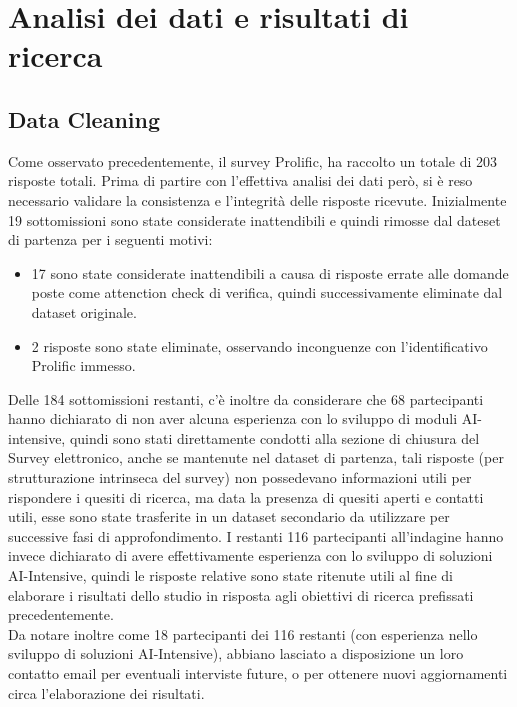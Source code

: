 \chapter{Analisi dei dati e  risultati di ricerca} %
%
     \section{Data Cleaning}
    
    Come osservato precedentemente, il survey Prolific, ha raccolto un totale di 203 risposte totali. Prima di partire con l'effettiva analisi dei dati però, si è reso necessario validare la consistenza e l'integrità delle risposte ricevute. Inizialmente 19 sottomissioni sono state considerate inattendibili e quindi rimosse dal dateset di partenza per i seguenti motivi:
    
    \begin{itemize}
        \item 17 sono state considerate inattendibili a causa di risposte errate alle domande poste come attenction check di verifica, quindi successivamente eliminate dal dataset originale.
        \item 2 risposte sono state eliminate, osservando inconguenze con l'identificativo Prolific immesso.
    \end{itemize}
     
    Delle 184 sottomissioni restanti, c'è inoltre da considerare che 68 partecipanti hanno dichiarato di non aver alcuna esperienza con lo sviluppo di moduli AI-intensive, quindi sono stati direttamente condotti alla sezione di chiusura del Survey elettronico, anche se mantenute nel dataset di partenza, tali risposte (per strutturazione intrinseca del survey) non possedevano informazioni utili per rispondere i quesiti di ricerca, ma data la presenza di quesiti aperti e contatti utili, esse sono state trasferite in un dataset secondario da utilizzare per successive fasi di approfondimento. I restanti 116 partecipanti all'indagine hanno invece dichiarato di avere effettivamente esperienza con lo sviluppo di soluzioni AI-Intensive, quindi le risposte relative sono state ritenute utili al fine di elaborare i risultati dello studio in risposta agli obiettivi di ricerca prefissati precedentemente.\\  
    
    
    Da notare inoltre come 18 partecipanti dei 116 restanti (con esperienza nello sviluppo di soluzioni AI-Intensive), abbiano lasciato a disposizione un loro contatto email per eventuali interviste future, o per ottenere nuovi aggiornamenti circa l'elaborazione dei risultati.  
    

